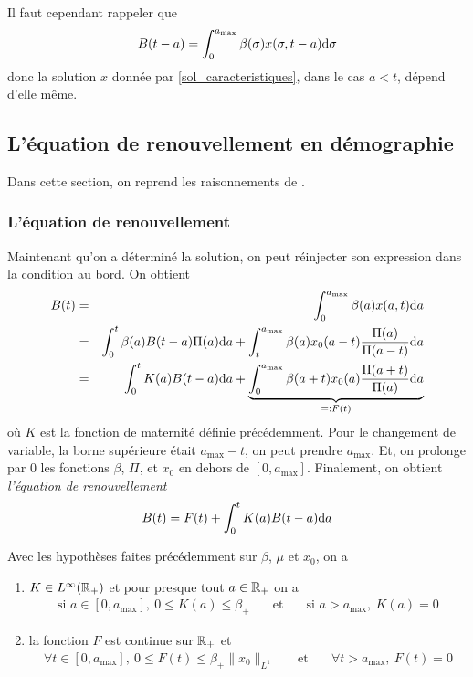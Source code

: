 \begin{remark}
    Il faut cependant rappeler que 
    \begin{equation*}
        B(t-a) = \int_0^{a_{\max}} \beta(\sigma)x(\sigma,t-a)\mathrm{d} \sigma
    \end{equation*}
    donc la solution $x$ donnée par \eqref{sol_caracteristiques}, dans le cas $a < t$, dépend d'elle même.
\end{remark}

\subsection{L'équation de renouvellement en démographie}
Dans cette section, on reprend les raisonnements de \cite{Iannelli2017, Brauer2019}.

\subsubsection{L'équation de renouvellement}
Maintenant qu'on a déterminé la solution, on peut réinjecter son expression dans la condition au bord. On obtient
\begin{eqnarray*}
    B(t) &=& \int_0^{a_{\max}} \beta(a)x(a,t)\mathrm{d} a \\
    &=& \int_0^t\beta(a)B(t-a)\Pi(a)\mathrm{d} a + \int_t^{a_{\max}} 
    \beta(a)x_0(a-t)\frac{\Pi(a)}{\Pi(a-t)}\mathrm{d} a \\
    &=& \int_0^t K(a)B(t-a)\mathrm{d} a + \underbrace{\int_0^{a_{\max}} \beta(a+t)x_0(a)\frac{\Pi(a+t)}{\Pi(a)}\mathrm{d} a}_{=:F(t)}
\end{eqnarray*}
où $K$ est la fonction de maternité définie précédemment. Pour le changement de variable, la borne supérieure était $a_{\max}-t$, on peut prendre $a_{\max}$. Et, on prolonge par $0$ les fonctions $\beta$, $\Pi$, et $x_0$ en dehors de $[0,a_{\max}]$. Finalement, on obtient \textcolor{astral}{\textit{l'équation de renouvellement}}
\begin{equation}\label{eq_renouvellement}
    B(t) = F(t)+\int_0^tK(a)B(t-a)\mathrm{d} a
\end{equation}

\begin{proposition}\label{thm_K_F}
    Avec les hypothèses faites précédemment sur $\beta$, $\mu$
    et $x_0$, on a 
    \begin{enumerate}
        \item $K \in L^{\infty}(\mathbb{R}_+)$ et pour presque tout $a \in \mathbb{R}_+$ on a 
        \begin{eqnarray*}
            \text{si } a \in [0,a_{\max}], \ 0 \leq K(a) \leq \beta_+
            \ \ \ &\text{ et }& \ \ \ \text{si } a > a_{\max}, \ K(a) = 0
        \end{eqnarray*}
        \item la fonction $F$ est continue sur $\mathbb{R}_+$ et 
        \begin{eqnarray*}
            \forall t \in [0,a_{\max}], \ 0 \leq F(t) \leq \beta_+\|x_0\|_{L^1}
            \ \ \ &\text{ et }& \ \ \ \forall t > a_{\max}, \ F(t) = 0
        \end{eqnarray*}
    \end{enumerate}
\end{proposition}

